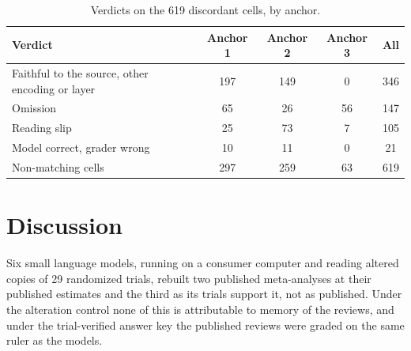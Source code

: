 \documentclass[11pt]{article}
\begin{document}
\begin{table}[!htbp]
\centering\small
\caption{Verdicts on the 619 discordant cells, by anchor.}
\label{tab:adj}
\begin{tabular}{lcccc}
\toprule
Verdict & Anchor 1 & Anchor 2 & Anchor 3 & All \\
\midrule
Faithful to the source, other encoding or layer & 197 & 149 & 0 & 346 \\
Omission & 65 & 26 & 56 & 147 \\
Reading slip & 25 & 73 & 7 & 105 \\
Model correct, grader wrong & 10 & 11 & 0 & 21 \\
\midrule
Non-matching cells & 297 & 259 & 63 & 619 \\
\bottomrule
\end{tabular}
\end{table}

\section{Discussion}

Six small language models, running on a consumer computer and reading altered copies of 29 randomized trials, rebuilt two published meta-analyses at their published estimates and the third as its trials support it, not as published. Under the alteration control none of this is attributable to memory of the reviews, and under the trial-verified answer key the published reviews were graded on the same ruler as the models.
\end{document}
